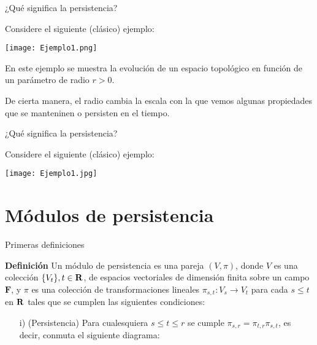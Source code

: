 \documentclass{beamer}
\def\R\re
\def \R{{\bf R}}
\def \re{{\mathbb R}}
\begin{document}
\begin{frame}{¿Qué significa la persistencia?}

Considere el siguiente (clásico) ejemplo:

\texttt{[image: Ejemplo1.png]}
\pause

En este ejemplo se muestra la evolución de un espacio topológico en función de un parámetro de radio $r>0$. 

\pause

De cierta manera, el radio cambia la escala con la que vemos algunas propiedades que se manteninen o persisten en el tiempo.

\end{frame}

\begin{frame}{¿Qué significa la persistencia?}

Considere el siguiente (clásico) ejemplo:

\texttt{[image: Ejemplo1.jpg]}

\end{frame}

\section{Módulos de persistencia}

\begin{frame}{Primeras definiciones}

\begin{block}{\textbf{Definición}}
Un módulo de persistencia es una pareja $(V, \pi)$, donde $V$ es una colección $\{V_t\}, t\in\R$, de espacios vectoriales de dimensión finita sobre un campo $\mathbf{F}$, y $\pi$ es una colección de transformaciones lineales $\pi_{s,t}:V_s \rightarrow V_t$ para cada $s\leq t$ en $\R$ tales que se cumplen las siguientes condiciones:

\pause

\begin{itemize}
    \item[i)] (Persistencia) Para cualesquiera $s\leq t\leq r$ se cumple $\pi_{s,r}=\pi_{t,r}\pi_{s,t}$, es decir, conmuta el siguiente diagrama:
    
\end{itemize}
    
\end{block}

\centerline{
}
    
\end{frame}
\end{document}
